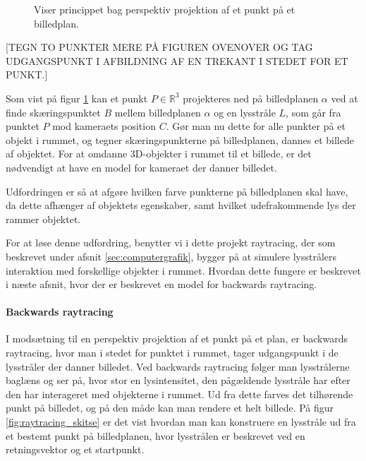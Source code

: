 \begin{figure}[H]
  \label{fig:perspektiv_projektion}
  \centering
  \caption{Viser princippet bag perspektiv projektion af et punkt på et billedplan.}
\end{figure}

[TEGN TO PUNKTER MERE PÅ FIGUREN OVENOVER OG TAG UDGANGSPUNKT I AFBILDNING AF EN TREKANT I STEDET FOR ET PUNKT.]

Som vist på figur \ref{fig:perspektiv_projektion} kan et punkt $P\in \mathbb{R}^3$ projekteres ned på billedplanen $\alpha$ ved at finde skæringspunktet $B$ mellem billedplanen $\alpha$ og en lysstråle $L$, som går fra punktet $P$ mod kameraets position $C$. Gør man nu dette for alle punkter på et objekt i rummet, og tegner skæringspunkterne på billedplanen, dannes et billede af objektet. For at omdanne 3D-objekter i rummet til et billede, er det nødvendigt at have en model for kameraet der danner billedet. 

Udfordringen er så at afgøre hvilken farve punkterne på billedplanen skal have, da dette afhænger af objektets egenskaber, samt hvilket udefrakommende lys der rammer objektet. 

For at løse denne udfordring, benytter vi i dette projekt raytracing, der som beskrevet under afsnit \ref{sec:computergrafik}, bygger på at simulere lysstrålers interaktion med forskellige objekter i rummet. Hvordan dette fungere er beskrevet i næste afsnit, hvor der er beskrevet en model for backwards raytracing.

\paragraph{Backwards raytracing}
I modsætning til en perspektiv projektion af et punkt på et plan, er backwards raytracing, hvor man i stedet for punktet i rummet, tager udgangspunkt i de lysstråler der danner billedet. Ved backwards raytracing følger man lysstrålerne baglæns og ser på, hvor stor en lysintensitet, den pågældende lysstråle har efter den har interageret med objekterne i rummet. Ud fra dette farves det tilhørende punkt på billedet, og på den måde kan man rendere et helt billede. På figur \ref{fig:raytracing_skitse} er det vist hvordan man kan konstruere en lysstråle ud fra et bestemt punkt på billedplanen, hvor lysstrålen er beskrevet ved en retningsvektor og et startpunkt.

